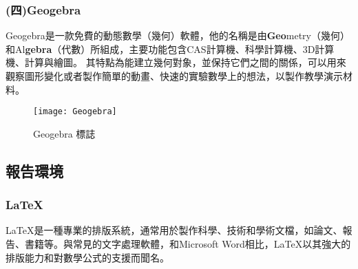 \subsubsection{(四)Geogebra}
Geogebra是一款免費的動態數學（幾何）軟體，他的名稱是由\textbf{Geo}metry（幾何）和Al\textbf{gebra}（代數）所組成，主要功能包含CAS計算機、科學計算機、3D計算機、計算與繪圖。
其特點為能建立幾何對象，並保持它們之間的關係，可以用來觀察圖形變化或者製作簡單的動畫、快速的實驗數學上的想法，以製作教學演示材料。\\
\begin{figure}[hbt!]
\center
\texttt{[image: Geogebra]}
\caption{\Large Geogebra 標誌}
\end{figure}

\subsection{報告環境}
\fontsize{14pt}{2.5pt}\sectionef\hspace{12pt}
\subsubsection{LaTeX}
\fontsize{14pt}{2.5pt}\sectionef\hspace{12pt}
LaTeX是一種專業的排版系統，通常用於製作科學、技術和學術文檔，如論文、報告、書籍等。與常見的文字處理軟體，和Microsoft Word相比，LaTeX以其強大的排版能力和對數學公式的支援而聞名。

\newpage

\renewcommand{\baselinestretch}{0.5} %